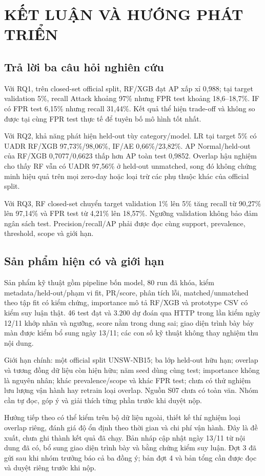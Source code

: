 
\chapter{KẾT LUẬN VÀ HƯỚNG PHÁT TRIỂN}\label{chap:conclusion}
\section{Trả lời ba câu hỏi nghiên cứu}
Với RQ1, trên closed-set official split, RF/XGB đạt AP xấp xỉ 0,988; tại target validation 5\%, recall Attack khoảng 97\% nhưng FPR test khoảng 18,6--18,7\%. IF có FPR test 6,15\% nhưng recall 31,44\%. Kết quả thể hiện trade-off và không so được tại cùng FPR test thực tế để tuyên bố mô hình tốt nhất.

Với RQ2, khả năng phát hiện held-out tùy category/model. LR tại target 5\% có UADR RF/XGB 97,73\%/98,06\%, IF/AE 0,66\%/23,82\%. AP Normal/held-out của RF/XGB 0,7077/0,6623 thấp hơn AP toàn test 0,9852. Overlap hậu nghiệm cho thấy RF vẫn có UADR 97,56\% ở held-out unmatched, song đó không chứng minh hiệu quả trên mọi zero-day hoặc loại trừ các phụ thuộc khác của official split.

Với RQ3, RF closed-set chuyển target validation 1\% lên 5\% tăng recall từ 90,27\% lên 97,14\% và FPR test từ 4,21\% lên 18,57\%. Ngưỡng validation không bảo đảm ngân sách test. Precision/recall/AP phải được đọc cùng support, prevalence, threshold, scope và giới hạn.

\section{Sản phẩm hiện có và giới hạn}
Sản phẩm kỹ thuật gồm pipeline bốn model, 80 run đã khóa, kiểm metadata/held-out/phạm vi fit, PR/score, phân tích lỗi, matched/unmatched theo tập fit có kiểm chứng, importance mô tả RF/XGB và prototype CSV có kiểm suy luận thật. 46 test đạt và 3.200 dự đoán qua HTTP trong lần kiểm ngày 12/11 khớp nhãn và ngưỡng, score nằm trong dung sai; giao diện trình bày bảy màn được kiểm bổ sung ngày 13/11; các con số kỹ thuật không thay nghiệm thu nội dung.

Giới hạn chính: một official split UNSW-NB15; ba lớp held-out hữu hạn; overlap và tương đồng dữ liệu còn hiện hữu; năm seed dùng cùng test; importance không là nguyên nhân; khác prevalence/scope và khác FPR test; chưa có thử nghiệm lưu lượng vận hành hay retrain loại overlap. Nguồn S07 chưa có toàn văn. Nhóm cần tự đọc, góp ý và giải thích từng phần trước khi duyệt nộp.

Hướng tiếp theo có thể kiểm trên bộ dữ liệu ngoài, thiết kế thí nghiệm loại overlap riêng, đánh giá độ ổn định theo thời gian và chi phí vận hành. Đây là đề xuất, chưa ghi thành kết quả đã chạy. Bản nháp cập nhật ngày 13/11 từ nội dung đã có, bổ sung giao diện trình bày và bằng chứng kiểm suy luận. Đợt 3 đã gửi sau khi nhóm trưởng báo cả ba đồng ý; bản đợt 4 và bản tổng cần được đọc và duyệt riêng trước khi nộp.
